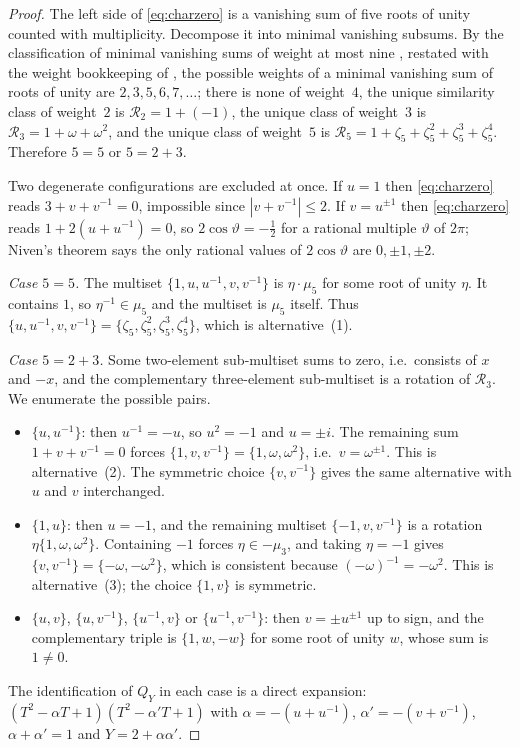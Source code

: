 \documentclass[a4paper]{article}
\newcommand{\abs}[1]{\left|#1\right|}
\begin{document}
\begin{proof}
	The left side of \eqref{eq:charzero} is a vanishing sum of five roots
	of unity counted with multiplicity.
	Decompose it into minimal vanishing subsums.
	By the classification of minimal vanishing sums of weight at most nine
	\cite[Theorem~6]{ConwayJones1976}, restated with the weight bookkeeping
	of \cite[Table~1]{PoonenRubinstein1998}, the possible weights of a
	minimal vanishing sum of roots of unity are
	$2,3,5,6,7,\ldots$; there is none of weight~$4$, the unique similarity
	class of weight~$2$ is $\mathcal{R}_2=1+(-1)$, the unique class of
	weight~$3$ is $\mathcal{R}_3=1+\omega+\omega^2$, and the unique class
	of weight~$5$ is $\mathcal{R}_5=1+\zeta_5+\zeta_5^2+\zeta_5^3+\zeta_5^4$.
	Therefore $5=5$ or $5=2+3$.

	Two degenerate configurations are excluded at once.
	If $u=1$ then \eqref{eq:charzero} reads $3+v+v^{-1}=0$, impossible
	since $\abs{v+v^{-1}}\leq2$.
	If $v=u^{\pm1}$ then \eqref{eq:charzero} reads $1+2(u+u^{-1})=0$, so
	$2\cos\vartheta=-\tfrac12$ for a rational multiple $\vartheta$ of
	$2\pi$; Niven's theorem \cite[Cor.~3.12]{Niven1956} says the only
	rational values of $2\cos\vartheta$ are $0,\pm1,\pm2$.

	\emph{Case $5=5$.}
	The multiset $\{1,u,u^{-1},v,v^{-1}\}$ is $\eta\cdot\mu_5$ for some
	root of unity $\eta$.
	It contains $1$, so $\eta^{-1}\in\mu_5$ and the multiset is $\mu_5$
	itself.
	Thus $\{u,u^{-1},v,v^{-1}\}=\{\zeta_5,\zeta_5^2,\zeta_5^3,\zeta_5^4\}$,
	which is alternative~(1).

	\emph{Case $5=2+3$.}
	Some two-element sub-multiset sums to zero, i.e.\ consists of $x$ and
	$-x$, and the complementary three-element sub-multiset is a rotation of
	$\mathcal{R}_3$.
	We enumerate the possible pairs.
	\begin{itemize}
		\item $\{u,u^{-1}\}$: then $u^{-1}=-u$, so $u^2=-1$ and
		      $u=\pm i$.
		      The remaining sum $1+v+v^{-1}=0$ forces
		      $\{1,v,v^{-1}\}=\{1,\omega,\omega^2\}$, i.e.\
		      $v=\omega^{\pm1}$.
		      This is alternative~(2).
		      The symmetric choice $\{v,v^{-1}\}$ gives the same
		      alternative with $u$ and $v$ interchanged.
		\item $\{1,u\}$: then $u=-1$, and the remaining multiset
		      $\{-1,v,v^{-1}\}$ is a rotation $\eta\{1,\omega,\omega^2\}$.
		      Containing $-1$ forces $\eta\in-\mu_3$, and taking
		      $\eta=-1$ gives $\{v,v^{-1}\}=\{-\omega,-\omega^2\}$,
		      which is consistent because $(-\omega)^{-1}=-\omega^2$.
		      This is alternative~(3); the choice $\{1,v\}$ is symmetric.
		\item $\{u,v\}$, $\{u,v^{-1}\}$, $\{u^{-1},v\}$ or
		      $\{u^{-1},v^{-1}\}$: then $v=\pm u^{\pm1}$ up to sign, and
		      the complementary triple is $\{1,w,-w\}$ for some root of
		      unity $w$, whose sum is $1\ne0$.
	\end{itemize}
	The identification of $Q_Y$ in each case is a direct expansion:
	$(T^2-\alpha T+1)(T^2-\alpha'T+1)$ with $\alpha=-(u+u^{-1})$,
	$\alpha'=-(v+v^{-1})$, $\alpha+\alpha'=1$ and $Y=2+\alpha\alpha'$.
\end{proof}
\end{document}
